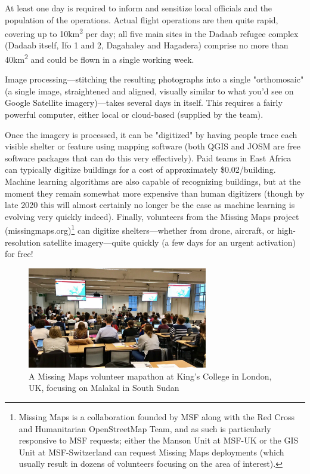 \documentclass[a4paper,12pt,twoside]{article}
\begin{document}
At least one day is required to inform and sensitize local officials and the population of the operations. Actual flight operations are then quite rapid, covering up to 10km\textsuperscript{2} per day; all five main sites in the Dadaab refugee complex (Dadaab itself, Ifo 1 and 2, Dagahaley and Hagadera) comprise no more than 40km\textsuperscript{2} and could be flown in a single working week. 

Image processing---stitching the resulting photographs into a single "orthomosaic" (a single image, straightened and aligned, visually similar to what you'd see on Google Satellite imagery)---takes several days in itself. This requires a fairly powerful computer, either local or cloud-based (supplied by the team).

Once the imagery is processed, it can be "digitized" by having people trace each visible shelter or feature using mapping software (both QGIS and JOSM are free software packages that can do this very effectively). Paid teams in East Africa can typically digitize buildings for a cost of approximately \$0.02/building. Machine learning algorithms are also capable of recognizing buildings, but at the moment they remain somewhat more expensive than human digitizers (though by late 2020 this will almost certainly no longer be the case as machine learning is evolving very quickly indeed). Finally, volunteers from the Missing Maps project (missingmaps.org)\footnote{Missing Maps is a collaboration founded by MSF along with the Red Cross and Humanitarian OpenStreetMap Team, and as such is particularly responsive to MSF requests; either the Manson Unit at MSF-UK or the GIS Unit at MSF-Switzerland can request Missing Maps deployments (which usually result in dozens of volunteers focusing on the area of interest).} can digitize shelters---whether from drone, aircraft, or high-resolution satellite imagery---quite quickly (a few days for an urgent activation) for free!  

\begin{figure}[H]
    \centering
    \includegraphics[width=0.7\textwidth]{images/MissingMapsMappingParty.png}
    \caption{A Missing Maps volunteer mapathon at King's College in London, UK, focusing on Malakal in South Sudan}
    \label{fig:Missing Maps Mapathon}
\end{figure}
\end{document}
